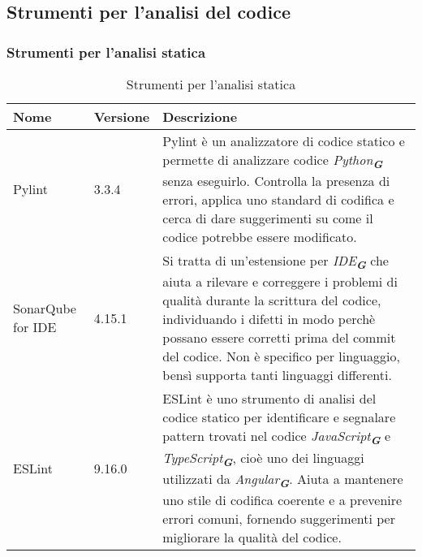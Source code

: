 \subsection{Strumenti per l’analisi del codice}

\subsubsection{Strumenti per l’analisi statica}
\label{subsec:strumenti_analisi_statica}
\begin{table}[h!]
    \centering
    \renewcommand{\arraystretch}{1.6} %
    \begin{tabularx}{\textwidth}{|p{2cm}|p{2cm}|X|} \hline
    \rowcolor[HTML]{FFD700} 
    \textbf{Nome} & \textbf{Versione} & \textbf{Descrizione} \\ \hline
    Pylint & 3.3.4 & Pylint è un analizzatore di codice statico e permette di
                    analizzare codice \emph{Python}\textsubscript{\textbf{\textit{G}}} senza eseguirlo. Controlla la presenza
                    di errori, applica uno standard di codifica e cerca di dare
                    suggerimenti su come il codice potrebbe essere modificato. \\ \hline
    SonarQube for IDE & 4.15.1 & Si tratta di un’estensione per \emph{IDE}\textsubscript{\textbf{\textit{G}}} 
                                che aiuta a rilevare
                                e correggere i problemi di qualità durante la scrittura
                                del codice, individuando i difetti in modo perchè possano
                                essere corretti prima del commit del codice. Non è specifico
                                per linguaggio, bensì supporta tanti linguaggi differenti. \\ \hline
    ESLint & 9.16.0 & ESLint è uno strumento di analisi del codice statico per identificare
                    e segnalare pattern trovati nel codice \emph{JavaScript}\textsubscript{\textbf{\textit{G}}}
                    e \emph{TypeScript}\textsubscript{\textbf{\textit{G}}}, cioè uno 
                    dei linguaggi utilizzati da \emph{Angular}\textsubscript{\textbf{\textit{G}}}. Aiuta a mantenere
                    uno stile di codifica
                    coerente e a prevenire errori comuni, fornendo suggerimenti per migliorare
                    la qualità del codice. \\ \hline
    \end{tabularx}
    \caption{Strumenti per l’analisi statica}
\end{table}

